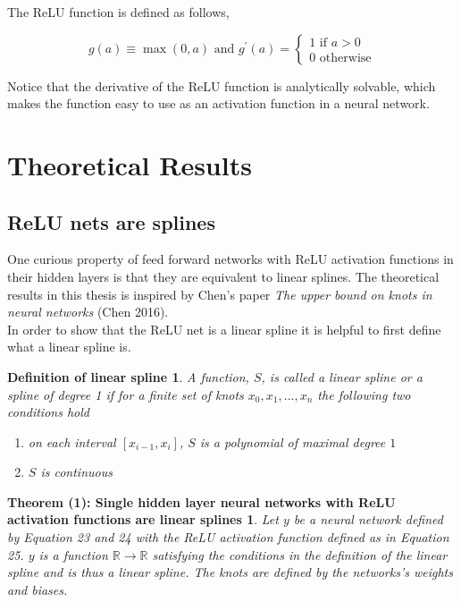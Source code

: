 \documentclass[11pt, letterpaper]{amsart}
\begin{document}
The ReLU function is defined as follows,

\begin{equation}
    g(a) \equiv \max(0,a) \text{ and } g^{\prime}(a) =         \begin{cases}
            1 \text{ if } a > 0 \\
            0 \text{ otherwise}
        \end{cases}
\end{equation}

Notice that the derivative of the ReLU function is analytically solvable, which makes the function easy to use as an activation function in a neural network.


\section{Theoretical Results}
\subsection{ReLU nets are splines}
One curious property of feed forward networks with ReLU activation functions in their hidden layers is that they are equivalent to linear splines. The theoretical results in this thesis is inspired by Chen's paper \textit{The upper bound on knots in neural networks} (Chen 2016).
\\

In order to show that the ReLU net is a linear spline it is helpful to first define what a linear spline is.

\newtheorem*{mydef3}{Definition of linear spline}
\begin{mydef3}
A function, $S$, is called a \textit{linear spline} or a \textit{spline of degree 1} if for a finite set of knots $x_0,x_1,...,x_n$ the following two conditions hold
\begin{enumerate}
    \item on each interval $[x_{i-1},x_i]$, $S$ is a polynomial of maximal degree $1$
    \item $S$ is continuous
\end{enumerate}
\end{mydef3}

\newtheorem*{mydef4}{Theorem (1): Single hidden layer neural networks with ReLU activation functions are linear splines}
\begin{mydef4}
Let $y$ be a neural network defined by Equation 23 and 24 with the ReLU activation function defined as in Equation 25. $y$ is a function  $\mathbb{R} \rightarrow \mathbb{R}$ satisfying the conditions in the definition of the linear spline and is thus a linear spline. The knots are defined by the networks's weights and biases.
\end{mydef4}
\end{document}
